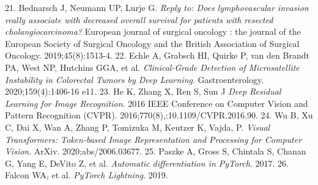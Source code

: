 \documentclass[12pt]{article}
\begin{document}
\begin{thebibliography}{22}
21.	Bednarsch J, Neumann UP, Lurje G. \textit{Reply to: Does lymphovascular invasion really associate with decreased overall survival for patients with resected cholangiocarcinoma?} European journal of surgical oncology : the journal of the European Society of Surgical Oncology and the British Association of Surgical Oncology. 2019;45(8):1513-4.
22.	Echle A, Grabsch HI, Quirke P, van den Brandt PA, West NP, Hutchins GGA, et al. \textit{Clinical-Grade Detection of Microsatellite Instability in Colorectal Tumors by Deep Learning}. Gastroenterology. 2020;159(4):1406-16 e11.
23. He K, Zhang X, Ren S, Sun J \textit{Deep Residual Learning for Image Recognition}. 2016 IEEE Conference on Computer Vision and Pattern Recognition (CVPR). 2016;770(8),:10.1109/CVPR.2016.90.
24. Wu B, Xu C, Dai X, Wan A, Zhang P, Tomizuka M, Keutzer K, Vajda, P. \textit{Visual Transformers: Token-based Image Representation and Processing for Computer Vision}. ArXiv. 2020;abs/2006.03677.
25. Paszke A, Gross S, Chintala S, Chanan G, Yang E, DeVito Z, et al. \textit{Automatic differentiation in PyTorch}. 2017.
26. Falcon WA, et al. \textit{PyTorch Lightning}. 2019.
\end{thebibliography}
%
%
\end{document}
